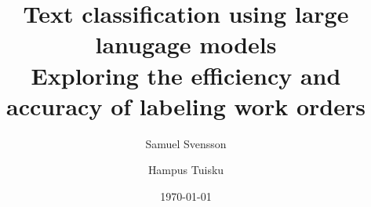 \documentclass{article}
\title{
    Text classification using large lanugage models
    \\ \large
    Exploring the efficiency and accuracy of labeling work orders
}
\author{Samuel Svensson \and Hampus Tuisku}
\date{\today}
\begin{document}
\maketitle





\pagebreak


\end{document}
